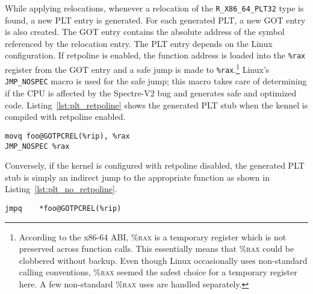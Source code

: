 While applying relocations, whenever a relocation of the \verb|R_X86_64_PLT32| type is found, a new PLT entry is generated. For each generated PLT, a new GOT entry is also created. The GOT entry contains the absolute address of the symbol referenced by the relocation entry. The PLT entry depends on the Linux configuration. If retpoline is enabled, the function address is loaded into the \verb|%rax| register from the GOT entry and a safe jump is made to \verb|%rax|.\footnote{According to the x86-64 ABI, \textsc{\%rax} is a temporary register which is not preserved across function calls. This essentially means that \textsc{\%rax} could be clobbered without backup. Even though Linux occasionally uses non-standard calling conventions, \textsc{\%rax} seemed the safest choice for a temporary register here. A few non-standard \textsc{\%rax} uses are handled separately.} Linux's \verb|JMP_NOSPEC| macro is used for the safe jump; this macro takes care of determining if the CPU is affected by the Spectre-V2 bug and generates safe and optimized code. Listing~\ref{lst:plt_retpoline} shows the generated PLT stub when the kennel is compiled with retpoline enabled.

\lstset{language=C}
\begin{lstlisting}[frame=single, caption={PLT Stub when Retpoline is Enabled},label={lst:plt_retpoline}]
movq foo@GOTPCREL(%rip), %rax
JMP_NOSPEC %rax
\end{lstlisting}

\pagebreak
Conversely, if the kernel is configured with retpoline disabled, the generated PLT stub is simply an indirect jump to the appropriate function as shown in Listing~\ref{lst:plt_no_retpoline}.

\lstset{language=C}
\begin{lstlisting}[frame=single, caption={PLT Stub when Retpoline is Disabled},label={lst:plt_no_retpoline}]
jmpq    *foo@GOTPCREL(%rip)
\end{lstlisting}